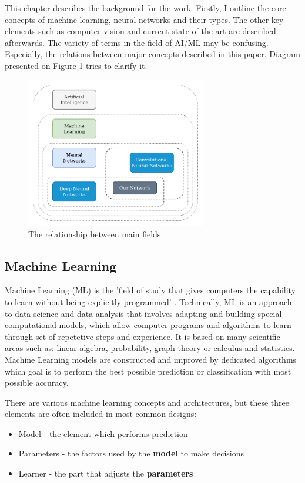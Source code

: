\documentclass[../Main.tex]{subfiles}
\begin{document}
    This chapter describes the background for the work. Firstly, I outline the core concepts of machine learning, neural networks and their types. The other key elements such as computer vision and current state of the art are described afterwards.
    The variety of terms in the field of AI/ML may be confusing. Especially, the relations between major concepts described in this paper. Diagram presented on Figure \ref{fig:AI-ML-Scheme} tries to clarify it.
    \begin{figure}[ht!]
        \centering
        \includegraphics[width=0.7\textwidth]{Images/02_AI-ML-Scheme.png}
        \caption{The relationship between main fields}
        \label{fig:AI-ML-Scheme}
    \end{figure}
    
\subsection{Machine Learning} 
    Machine Learning (ML) is the 'field of study that gives computers the capability to learn without being explicitly programmed' \cite{Samuel1959SomeSI}. Technically, ML is an approach to data science and data analysis that involves adapting and building special computational models, which allow computer programs and algorithms to learn through set of repetetive steps and experience. It is based on many scientific areas such as: linear algebra, probability, graph theory or calculus and statistics. Machine Learning models are constructed and improved by dedicated algorithms which goal is to perform the best possible prediction or classification with most possible accuracy.
    
    There are various machine learning concepts and architectures, but these three elements are often included in most common designs:
    \begin{itemize}
        \item Model - the element which performs prediction
        \item Parameters - the factors used by the \textbf{model} to make decisions
        \item Learner - the part that adjusts the \textbf{parameters}
    \end{itemize}
    
\end{document}

